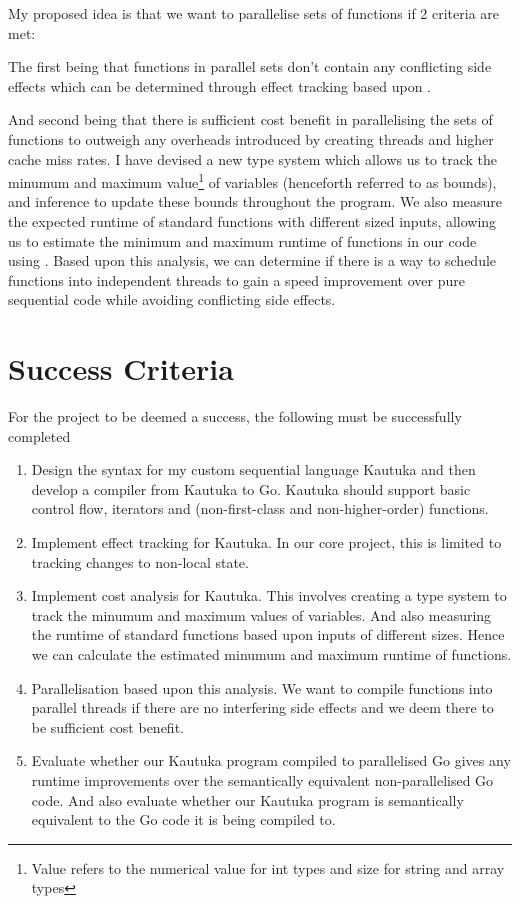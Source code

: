 \documentclass[12pt,a4paper,twoside,openright]{report}
\begin{document}
My proposed idea is that we want to parallelise sets of functions if 2 criteria are met:

The first being that functions in parallel sets don't contain any conflicting side effects which can be determined through effect tracking based upon \cite{Optimising-Compilers-Lecture-13-Effect-Systems}. 

And second being that there is sufficient cost benefit in parallelising the sets of functions to outweigh any overheads introduced by creating threads and higher cache miss rates. I have devised a new type system which allows us to track the minumum and maximum value\footnote{Value refers to the numerical value for int types and size for string and array types} of variables (henceforth referred to as bounds), and inference to update these bounds throughout the program. We also measure the expected runtime of standard functions with different sized inputs, allowing us to estimate the minimum and maximum runtime of functions in our code using \cite{10.1145/361002.361016}. Based upon this analysis, we can determine if there is a way to schedule functions into independent threads to gain a speed improvement over pure sequential code while avoiding conflicting side effects. 

\newpage 

\section*{Success Criteria}

For the project to be deemed a success, the following must be successfully completed 

\begin{enumerate}
  \item Design the syntax for my custom sequential language Kautuka and then develop a compiler from Kautuka to Go. Kautuka should support basic control flow, iterators and (non-first-class and non-higher-order) functions.
  \item  Implement effect tracking for Kautuka. In our core project, this is limited to tracking changes to non-local state. 
  \item Implement cost analysis for Kautuka. This involves creating a type system to track the minumum and maximum values of variables. And also measuring the runtime of standard functions based upon inputs of different sizes. Hence we can calculate the estimated minumum and maximum runtime of functions. 
  \item Parallelisation based upon this analysis. We want to compile functions into parallel threads if there are no interfering side effects and we deem there to be sufficient cost benefit.
  \item Evaluate whether our Kautuka program compiled to parallelised Go gives any runtime improvements over the semantically equivalent non-parallelised Go code. And also evaluate whether our Kautuka program is semantically equivalent to the Go code it is being compiled to. 
\end{enumerate}
\end{document}
